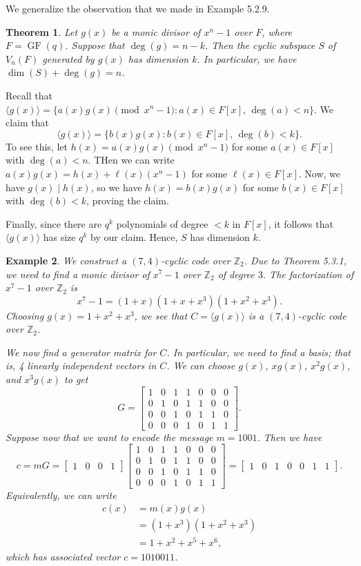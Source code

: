 \documentclass[10pt]{article}
\makeatletter
\newcommand{\Z}{\mathbb{Z}}
\DeclareMathOperator{\GF}{GF}
\theoremstyle{newstyle}
\newtheorem{thm}{Theorem}[subsection]
\newtheorem{exmp}[thm]{Example}
\newenvironment{pf}[1][\proofname]{\par
  \pushQED{\qed}%
  \normalfont \topsep0\p@\relax
  \trivlist
  \item[\hskip\labelsep\scshape
  #1\@addpunct{.}]\ignorespaces
}{%
  \popQED\endtrivlist\@endpefalse
}
\makeatother
\begin{document}
We generalize the observation that we made in Example 5.2.9. 

\begin{thm}
Let $g(x)$ be a monic divisor of $x^n - 1$ over $F$, where $F = \GF(q)$. Suppose that 
$\deg(g) = n-k$. Then the cyclic subspace $S$ of $V_n(F)$ generated by $g(x)$ has 
dimension $k$. In particular, we have $\dim(S) + \deg(g) = n$.
\end{thm}
\begin{pf}
Recall that $\langle g(x) \rangle = \{a(x)g(x) \pmod{x^n-1} : a(x) \in F[x],\, \deg(a) < n\}$. 
We claim that 
\[ \langle g(x) \rangle = \{b(x)g(x) : b(x) \in F[x],\, \deg(b) < k\}. \]
To see this, let $h(x) = a(x)g(x) \pmod{x^n-1}$ for some $a(x) \in F[x]$ with 
$\deg(a) < n$. THen we can write $a(x)g(x) = h(x) + \ell(x)(x^n-1)$ for some $\ell(x) 
\in F[x]$. Now, we have $g(x) \mid h(x)$, so we have $h(x) = b(x)g(x)$ for some 
$b(x) \in F[x]$ with $\deg(b) < k$, proving the claim. 

Finally, since there are $q^k$ polynomials of degree $<k$ in $F[x]$, it follows that 
$\langle g(x) \rangle$ has size $q^k$ by our claim. Hence, $S$ has dimension $k$. 
\end{pf}

\begin{exmp}
We construct a $(7, 4)$-cyclic code over $\Z_2$. Due to Theorem 5.3.1, we need to find a 
monic divisor of $x^7 - 1$ over $\Z_2$ of degree $3$. The factorization of $x^7 - 1$ over 
$\Z_2$ is 
\[ x^7 - 1 = (1+x)(1+x+x^3)(1+x^2+x^3). \]
Choosing $g(x) = 1+x^2+x^3$, we see that $C = \langle g(x) \rangle$ is a 
$(7, 4)$-cyclic code over $\Z_2$. 

We now find a generator matrix for $C$. In particular, we need to find a basis; that is, 
4 linearly independent vectors in $C$. We can choose $g(x)$, $xg(x)$, $x^2g(x)$, and 
$x^3g(x)$ to get 
\[ G = \begin{bmatrix} 1 & 0 & 1 & 1 & 0 & 0 & 0 \\ 
0 & 1 & 0 & 1 & 1 & 0 & 0 \\
0 & 0 & 1 & 0 & 1 & 1 & 0 \\
0 & 0 & 0 & 1 & 0 & 1 & 1 \end{bmatrix}. \]
Suppose now that we want to encode the message $m = 1001$. Then we have 
\[ c = mG = \begin{bmatrix} 1 & 0 & 0 & 1 \end{bmatrix} 
\begin{bmatrix} 1 & 0 & 1 & 1 & 0 & 0 & 0 \\ 
0 & 1 & 0 & 1 & 1 & 0 & 0 \\
0 & 0 & 1 & 0 & 1 & 1 & 0 \\
0 & 0 & 0 & 1 & 0 & 1 & 1 \end{bmatrix} = \begin{bmatrix} 1 & 0 & 1 & 0 & 0 & 1 & 1 \end{bmatrix}. \]
Equivalently, we can write 
\begin{align*}
    c(x) &= m(x)g(x) \\
    &= (1+x^3)(1+x^2+x^3) \\
    &= 1+x^2+x^5+x^6,
\end{align*}
which has associated vector $c = 1010011$. 
\end{exmp}
\end{document}
